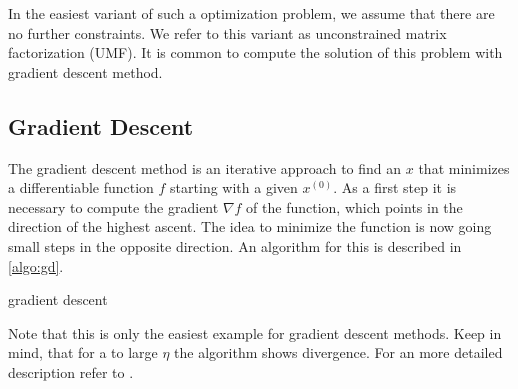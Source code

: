 \documentclass[DIV=14,twocolumn]{scrartcl}
\begin{document}
In the easiest variant of such a optimization problem, we assume that there are no further constraints. We refer to this variant as unconstrained matrix factorization (UMF). 
It is common to compute the solution of this problem with gradient descent method.

\subsection{Gradient Descent}\label{gd}
The gradient descent method is an iterative approach to find an $x$ that minimizes a differentiable function $f$ starting with a given $x^{(0)}$. As a first step it is necessary to compute the gradient $\nabla f$ of the function, which points in the direction of the highest ascent. 
The idea to minimize the function is now going small steps in the opposite direction. An algorithm for this is described in \autoref{algo:gd}. 

\begin{algorithm}
	\caption{gradient descent}
	\label{algo:gd}

\end{algorithm}
Note that this is only the easiest example for gradient descent methods. Keep in mind, that for a to large $\eta$ the algorithm shows divergence.
For an more detailed description refer to \cite{ShSh14}. 
\end{document}
